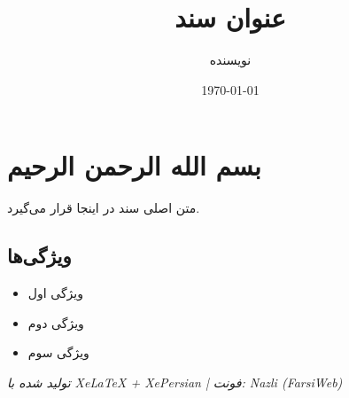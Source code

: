 \documentclass[12pt]{article}
\title{عنوان سند}
\author{نویسنده}
\date{\today}
\begin{document}
\maketitle

\section*{بسم الله الرحمن الرحیم}

متن اصلی سند در اینجا قرار می‌گیرد.

\subsection*{ویژگی‌ها}

\begin{itemize}
\item ویژگی اول
\item ویژگی دوم
\item ویژگی سوم
\end{itemize}

\vspace{1cm}
\begin{center}
\textit{\small تولید شده با XeLaTeX + XePersian | فونت: Nazli (FarsiWeb)}
\end{center}
\end{document}
